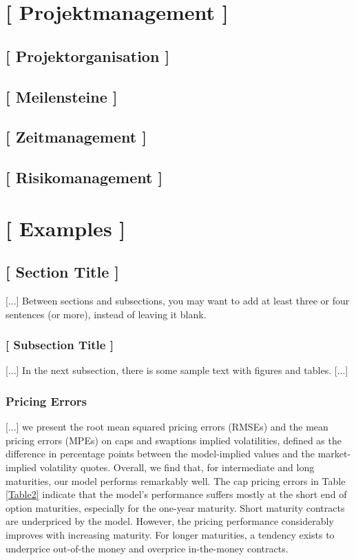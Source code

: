 \documentclass[11pt,a4paper,english,oneside]{book}
\numberwithin{equation}{chapter}
\begin{document}
\chapter{ [ Projektmanagement ]}

\section{ [ Projektorganisation ] }

\section{ [ Meilensteine ] }

\section{ [ Zeitmanagement ] }

\section{ [ Risikomanagement ] }


\chapter{ [ Examples ]}

\section{[ Section Title ]}

[...] Between sections and subsections, you may want to add at least three or four sentences (or more), instead of leaving it blank.

\subsection{[ Subsection Title ]}

[...] In the next subsection, there is some sample text with figures and tables. [...]




\subsection{Pricing Errors}


[...] we present the root mean squared pricing errors (RMSEs) and the mean pricing errors (MPEs) on caps and swaptions implied volatilities, defined as the difference in percentage points between the model-implied values and the market-implied volatility quotes. Overall, we find that, for intermediate and long maturities, our model performs remarkably well. The cap pricing errors in Table \ref{Table2} indicate that the model's performance suffers mostly at the short end of option maturities, especially for the one-year maturity. Short maturity contracts are underpriced by the model. However, the pricing performance considerably improves with increasing maturity. For longer maturities, a tendency exists to underprice out-of-the money and overprice in-the-money contracts.
\end{document}
